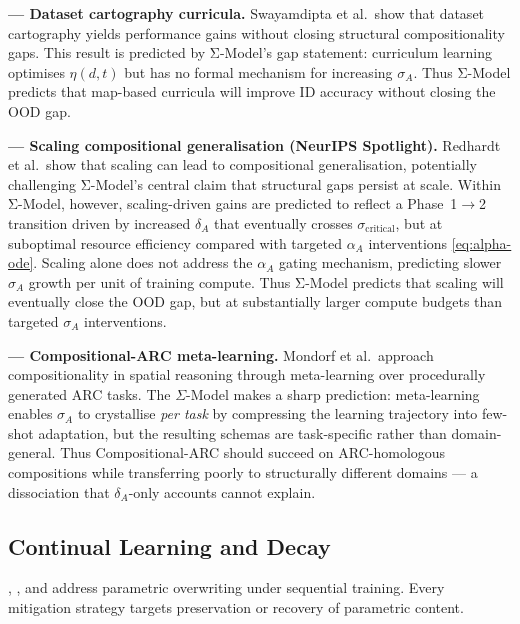 \textbf{\cite{swayamdipta2020datasetcartography} --- Dataset cartography curricula.}
Swayamdipta et al.\ show that dataset cartography yields performance
gains without closing structural compositionality gaps. This result is
predicted by Σ-Model's gap statement: curriculum learning optimises
$\eta(d,t)$ but has no formal mechanism for increasing $\sigma_A$.
Thus Σ-Model predicts that map-based curricula will improve ID
accuracy without closing the OOD gap.

\textbf{\cite{redhardt2025} --- Scaling compositional generalisation (NeurIPS Spotlight).}
Redhardt et al.~show that scaling can lead to compositional generalisation,
potentially challenging Σ-Model's central claim that structural gaps persist at
scale. Within Σ-Model, however, scaling-driven gains are predicted to reflect a
Phase~1$\to$2 transition driven by increased $\delta_A$ that eventually crosses
$\sigma_{\text{critical}}$, but at suboptimal resource efficiency compared with
targeted $\alpha_A$ interventions \eqref{eq:alpha-ode}. Scaling alone does not
address the $\alpha_A$ gating mechanism, predicting slower $\sigma_A$ growth per
unit of training compute.
Thus Σ-Model predicts that scaling will eventually close the OOD gap, but at
substantially larger compute budgets than targeted $\sigma_A$ interventions.

\textbf{\cite{mondorf2026compositionalarc} --- Compositional-ARC meta-learning.}
Mondorf et al.~approach compositionality in spatial reasoning through meta-learning
over procedurally generated ARC tasks. The $\Sigma$-Model makes a sharp prediction:
meta-learning enables $\sigma_A$ to crystallise \emph{per task} by compressing the
learning trajectory into few-shot adaptation, but the resulting schemas are
task-specific rather than domain-general. Thus Compositional-ARC should succeed on
ARC-homologous compositions while transferring poorly to structurally different
domains --- a dissociation that $\delta_A$-only accounts cannot explain.

\subsection{Continual Learning and Decay}\label{sec:continual-learning}

\cite{mccloskey1989catastrophicinterference},
\cite{goodfellow2013empiricalinvestigationcatastrophicforgetting}, and
\cite{kirkpatrick2017overcomingcatastrophicforgetting} address parametric
overwriting under sequential training. Every mitigation strategy targets
preservation or recovery of parametric content.

